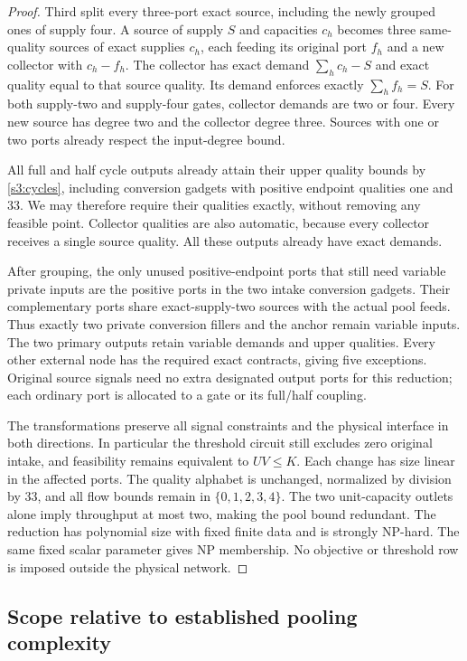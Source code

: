\begin{proof}
Third split every three-port exact source, including the newly grouped
ones of supply four. A source of supply $S$ and capacities $c_h$ becomes
three same-quality sources of exact supplies $c_h$, each feeding its
original port $f_h$ and a new collector with $c_h-f_h$. The collector
has exact demand $\sum_hc_h-S$ and exact quality equal to that source
quality. Its demand enforces exactly $\sum_hf_h=S$. For both supply-two
and supply-four gates, collector demands are two or four. Every new
source has degree two and the collector degree three. Sources with one
or two ports already respect the input-degree bound.

All full and half cycle outputs already attain their upper quality
bounds by \cref{s3:cycles}, including conversion gadgets with positive
endpoint qualities one and 33. We may therefore require their qualities
exactly, without removing any feasible point. Collector qualities are
also automatic, because every collector receives a single source
quality. All these outputs already have exact demands.

After grouping, the only unused positive-endpoint ports that still
need variable private inputs are the positive ports in the two intake
conversion gadgets. Their complementary ports share exact-supply-two
sources with the actual pool feeds. Thus exactly two private conversion
fillers and the anchor remain variable inputs. The two primary outputs
retain variable demands and upper qualities. Every other external node
has the required exact contracts, giving five exceptions. Original source
signals need no extra designated output ports for this reduction; each
ordinary port is allocated to a gate or its full/half coupling.

The transformations preserve all signal constraints and the physical
interface in both directions. In particular the threshold circuit still
excludes zero original intake, and feasibility remains equivalent to
$UV\le K$. Each change has size linear in the affected ports. The
quality alphabet is unchanged, normalized by division by 33, and all
flow bounds remain in $\{0,1,2,3,4\}$. The two unit-capacity outlets
alone imply throughput at most two, making the pool bound redundant.
The reduction has polynomial size with fixed finite data and is strongly
NP-hard. The same fixed scalar parameter gives NP membership. No
objective or threshold row is imposed outside the physical network.
\end{proof}

\subsection{Scope relative to established pooling complexity}\label{s3:scope}

